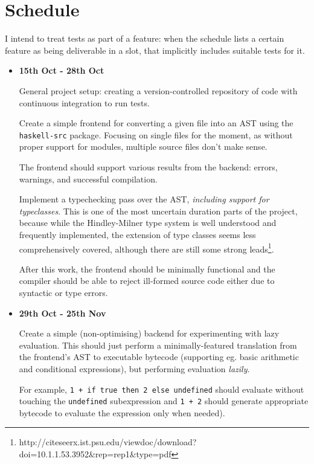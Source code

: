 \documentclass[12pt]{article}
\newcommand\haskell[1]{\texttt{#1}}
\newcommand\monospace[1]{\texttt{#1}}
\begin{document}
\section*{Schedule}

I intend to treat tests as part of a feature: when the schedule lists a certain feature as being deliverable in a slot,
that implicitly includes suitable tests for it.

\begin{itemize}
\item
{
    \textbf{15th Oct - 28th Oct}

    General project setup: creating a version-controlled repository of code with continuous integration to run tests.

    Create a simple frontend for converting a given file into an AST using the \monospace{haskell-src} package. Focusing
    on single files for the moment, as without proper support for modules, multiple source files don't make sense.

    The frontend should support various results from the backend: errors, warnings, and successful compilation.

    Implement a typechecking pass over the AST, \textit{including support for typeclasses}. This is one of the most
    uncertain duration parts of the project, because while the Hindley-Milner type system is well understood and
    frequently implemented, the extension of type classes seems less comprehensively covered, although there are still
    some strong leads\footnote{http://citeseerx.ist.psu.edu/viewdoc/download?doi=10.1.1.53.3952\&rep=rep1\&type=pdf}.

    After this work, the frontend should be minimally functional and the compiler should be able to reject ill-formed
    source code either due to syntactic or type errors.

}
\item
{
    \textbf{29th Oct - 25th Nov}

    Create a simple (non-optimising) backend for experimenting with lazy evaluation. This should just perform a
    minimally-featured translation from the frontend's AST to executable bytecode (supporting eg. basic arithmetic and
    conditional expressions), but performing evaluation \textit{lazily}.

    For example, \haskell{1 + if true then 2 else undefined} should evaluate without touching the \haskell{undefined}
    subexpression and \haskell{1 + 2} should generate appropriate bytecode to evaluate the expression only when needed).
    
}
\end{itemize}
\end{document}
